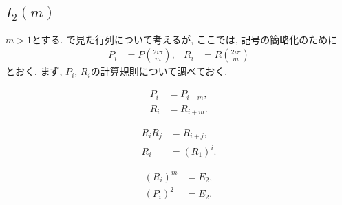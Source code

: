 \subsection{$I_2(m)$}
\label{ex:i2m:grp}
$m>1$とする.
で見た行列について考えるが,
ここでは, 記号の簡略化のために
\begin{align*}
  P_i
  &=P\left(\frac{2i\pi}{m}\right),&
  R_i
  &=R\left(\frac{2i\pi}{m}\right)
\end{align*}
とおく.
まず, $P_i$, $R_i$の計算規則について調べておく.
\begin{lemma}
  \begin{align*}
    P_i &= P_{i+m},\\
    R_i &= R_{i+m}.
  \end{align*}
\end{lemma}
\begin{lemma}
  \begin{align*}
    R_i R_j&= R_{i+j},\\
    R_i&=(R_1)^i.
  \end{align*}
\end{lemma}
\begin{lemma}
  \begin{align*}
    (R_i)^m&=E_2,\\
    (P_i)^2&=E_2.
  \end{align*}
\end{lemma}

